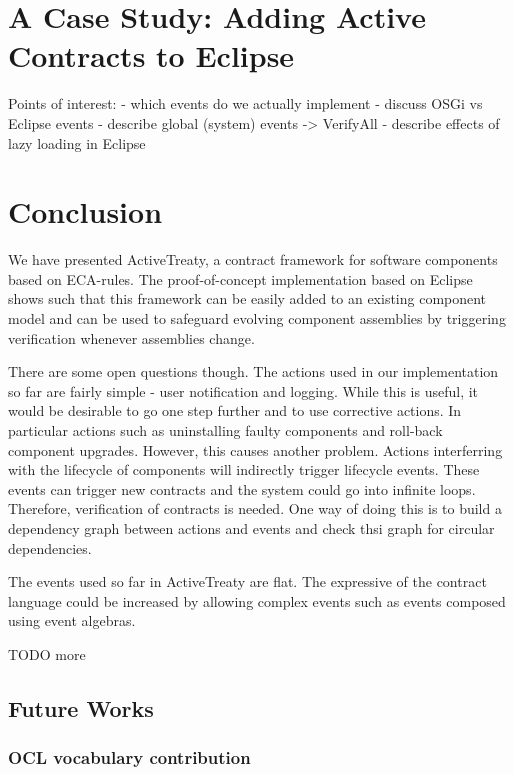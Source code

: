 \documentclass{llncs}
\begin{document}
\section{A Case Study: Adding Active Contracts to Eclipse}


Points of interest:
- which events do we actually implement
- discuss OSGi vs Eclipse events
- describe global (system) events -> VerifyAll
- describe effects of lazy loading in Eclipse


\section{Conclusion}


We have presented ActiveTreaty, a contract framework for software components based on ECA-rules. The proof-of-concept implementation based on Eclipse shows such that this framework can be easily added to an existing component model and can be used to safeguard evolving component assemblies by triggering verification whenever assemblies change. 

There are some open questions though. The actions used in our implementation so far are fairly simple - user notification and logging. While this is useful, it would be desirable to go one step further and to use corrective actions.  In particular actions such as uninstalling faulty components and roll-back component upgrades. However, this causes another problem. Actions interferring with the lifecycle of components will indirectly trigger lifecycle events. These events can trigger new contracts and the system could go into infinite loops. Therefore, verification of contracts is needed. One way of doing this is to build a dependency graph between actions and events and check thsi graph for circular dependencies. 

The events used so far in ActiveTreaty are flat. The expressive of the contract language could be increased by allowing complex events such as events composed using event algebras. 

TODO more

\subsection{Future Works}

\subsubsection{OCL vocabulary contribution}
\end{document}
